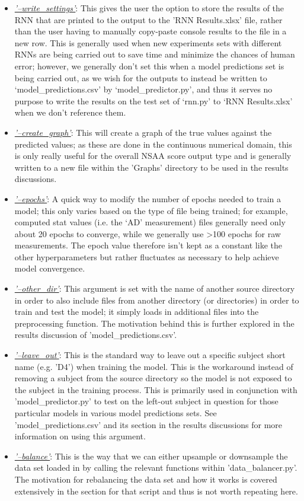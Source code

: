 \documentclass[12pt,twoside]{report}
\begin{document}
\begin{itemize}
	\item \underline{\textit{'--write\_settings'}}: This gives the user the option to store the results of the RNN that are printed to the output to the 'RNN Results.xlsx' file, rather than the user having to manually copy-paste console results to the file in a new row. This is generally used when new experiments sets with different RNNs are being carried out to save time and minimize the chances of human error; however, we generally don’t set this when a model predictions set is being carried out, as we wish for the outputs to instead be written to ‘model\_predictions.csv’ by ‘model\_predictor.py’, and thus it serves no purpose to write the results on the test set of ‘rnn.py’ to ‘RNN Results.xlsx’ when we don’t reference them.
	\item \underline{\textit{'--create\_graph'}}: This will create a graph of the true values against the predicted values; as these are done in the continuous numerical domain, this is only really useful for the overall NSAA score output type and is generally written to a new file within the 'Graphs' directory to be used in the results discussions.
	\item \underline{\textit{'--epochs'}}: A quick way to modify the number of epochs needed to train a model; this only varies based on the type of file being trained; for example, computed stat values (i.e. the ‘AD’ measurement) files generally need only about 20 epochs to converge, while we generally use >100 epochs for raw measurements. The epoch value therefore isn't kept as a constant like the other hyperparameters but rather fluctuates as necessary to help achieve model convergence.
	\item \underline{\textit{'--other\_dir'}}: This argument is set with the name of another source directory in order to also include files from another directory (or directories) in order to train and test the model; it simply loads in additional files into the preprocessing function. The motivation behind this is further explored in the results discussion of 'model\_predictions.csv'.
	\item \underline{\textit{'--leave\_out'}}: This is the standard way to leave out a specific subject short name (e.g. 'D4') when training the model. This is the workaround instead of removing a subject from the source directory so the model is not exposed to the subject in the training process. This is primarily used in conjunction with 'model\_predictor.py' to test on the left-out subject in question for those particular models in various model predictions sets. See 'model\_predictions.csv' and its section in the results discussions for more information on using this argument.
	\item \underline{\textit{'--balance'}}: This is the way that we can either upsample or downsample the data set loaded in by calling the relevant functions within 'data\_balancer.py'. The motivation for rebalancing the data set and how it works is covered extensively in the section for that script and thus is not worth repeating here.

\end{itemize}
\end{document}
